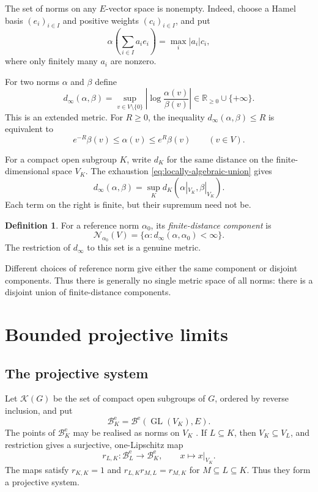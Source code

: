 \documentclass[12pt]{article}
\theoremstyle{definition}
\newtheorem{definition}[theorem]{Definition}
\theoremstyle{remark}
\newcommand{\R}{\mathbb R}
\newcommand{\Norm}{\mathscr N}
\newcommand{\dinf}{d_{\infty}}
\newcommand{\Building}{\mathcal B}
\DeclareMathOperator{\GL}{GL}
\begin{document}
The set of norms on any $E$-vector space is nonempty.  Indeed, choose a
Hamel basis $(e_i)_{i\in I}$ and positive weights $(c_i)_{i\in I}$, and
put
\[
  \alpha\left(\sum_{i\in I}a_i e_i\right)
     =\max_i |a_i|c_i,
\]
where only finitely many $a_i$ are nonzero.

For two norms $\alpha$ and $\beta$ define
\begin{equation}\label{eq:distance}
  \dinf(\alpha,\beta)
   =\sup_{v\in V\setminus\{0\}}
     \left|\log\frac{\alpha(v)}{\beta(v)}\right|
   \in\R_{\geq0}\cup\{+\infty\}.
\end{equation}
This is an extended metric.  For $R\geq0$, the inequality
$\dinf(\alpha,\beta)\leq R$ is equivalent to
\begin{equation}\label{eq:comparison}
  e^{-R}\beta(v)\leq\alpha(v)\leq e^R\beta(v)
  \qquad(v\in V).
\end{equation}

For a compact open subgroup $K$, write $d_K$ for the same distance on
the finite-dimensional space $V_K$.  The exhaustion
\eqref{eq:locally-algebraic-union} gives
\begin{equation}\label{eq:distance-fixed}
  \dinf(\alpha,\beta)
    =\sup_Kd_K(\alpha|_{V_K},\beta|_{V_K}).
\end{equation}
Each term on the right is finite, but their supremum need not be.

\begin{definition}\label{def:component}
For a reference norm $\alpha_0$, its \emph{finite-distance component}
is
\[
  \Norm_{\alpha_0}(V)
    =\{\alpha:\dinf(\alpha,\alpha_0)<\infty\}.
\]
The restriction of $\dinf$ to this set is a genuine metric.
\end{definition}

Different choices of reference norm give either the same component or
disjoint components.  Thus there is generally no single metric space of
all norms: there is a disjoint union of finite-distance components.

\section{Bounded projective limits}
\label{sec:inverse-limit}

\subsection{The projective system}

Let $\mathcal K(G)$ be the set of compact open subgroups of $G$, ordered
by reverse inclusion, and put
\[
 \Building_K^{\mathrm e}=\Building^{\mathrm e}(\GL(V_K),E).
\]
The points of $\Building_K^{\mathrm e}$ may be realised as norms on
$V_K$ \cite{MR144889,MR2439729}.  If $L\subseteq K$, then
$V_K\subseteq V_L$, and restriction gives a surjective, one-Lipschitz
map
\[
  r_{L,K}:\Building_L^{\mathrm e}\longrightarrow
  \Building_K^{\mathrm e},\qquad
  x\longmapsto x|_{V_K}.
\]
The maps satisfy $r_{K,K}=1$ and
$r_{L,K}r_{M,L}=r_{M,K}$ for $M\subseteq L\subseteq K$.  Thus they
form a projective system.
\end{document}
